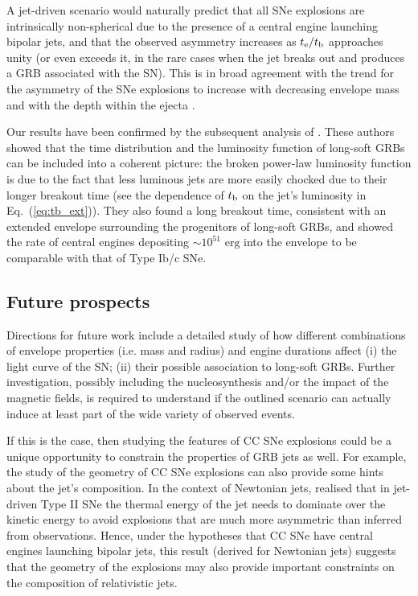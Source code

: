 \documentclass[useAMS,usenatbib]{mn2e}
\begin{document}
A jet-driven scenario would naturally predict that all SNe explosions are intrinsically non-spherical due to the presence of a central engine launching bipolar jets, and that the observed asymmetry increases as $t_{\rm e}/t_{\rm b}$ approaches unity (or even exceeds it, in the rare cases when the jet breaks out and produces a GRB associated with the SN). This is in broad agreement with the trend for the asymmetry of the SNe explosions to increase with decreasing envelope mass and with the depth within the ejecta \citep{Wang2001}.

Our results have been confirmed by the subsequent analysis of \citet{Petropoulou2017}. These authors showed that the time distribution and the luminosity function of long-soft GRBs can be included into a coherent picture: the broken power-law luminosity function is due to the fact that less luminous jets are more easily chocked due to their longer breakout time (see the dependence of $t_{\rm b}$ on the jet's luminosity in Eq.~(\ref{eq:tb_ext})). They also found a long breakout time, consistent with an extended envelope surrounding the progenitors of long-soft GRBs, and showed the rate of central engines depositing $\sim 10^{51}\text{ erg}$ into the envelope to be comparable with that of Type Ib/c SNe.


\subsection{Future prospects}

Directions for future work include a detailed study of how different combinations of envelope properties (i.e. mass and radius) and engine durations affect (i) the light curve of the SN; (ii) their possible association to long-soft GRBs. Further investigation, possibly including the nucleosynthesis and/or the impact of the magnetic fields, is required to understand if the outlined scenario can actually induce at least part of the wide variety of observed events.

If this is the case, then studying the features of CC SNe explosions could be a unique opportunity to constrain the properties of GRB jets as well. For example, the study of the geometry of CC SNe explosions can also provide some hints about the jet's composition. In the context of Newtonian jets, \citet{Couch2009} realised that in jet-driven Type II SNe the thermal energy of the jet needs to dominate over the kinetic energy to avoid explosions that are much more asymmetric than inferred from observations. Hence, under the hypotheses that CC SNe have central engines launching bipolar jets, this result (derived for Newtonian jets) suggests that the geometry of the explosions may also provide important constraints on the composition of relativistic jets.
\end{document}
